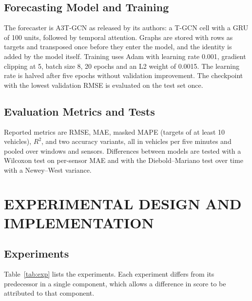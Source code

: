 \documentclass[MTech]{ugthesis}
\begin{document}
\section{Forecasting Model and Training}
The forecaster is A3T-GCN as released by its authors: a T-GCN cell with a GRU of 100 units, followed by temporal attention. Graphs are stored with rows as targets and transposed once before they enter the model, and the identity is added by the model itself. Training uses Adam with learning rate 0.001, gradient clipping at 5, batch size 8, 20 epochs and an L2 weight of 0.0015. The learning rate is halved after five epochs without validation improvement. The checkpoint with the lowest validation RMSE is evaluated on the test set once.

\section{Evaluation Metrics and Tests}
Reported metrics are RMSE, MAE, masked MAPE (targets of at least 10 vehicles), $R^2$, and two accuracy variants, all in vehicles per five minutes and pooled over windows and sensors. Differences between models are tested with a Wilcoxon test on per-sensor MAE and with the Diebold--Mariano test \citep{diebold1995} over time with a Newey--West variance.

\chapter{EXPERIMENTAL DESIGN AND IMPLEMENTATION}

\section{Experiments}
Table~\ref{tab:exp} lists the experiments. Each experiment differs from its predecessor in a single component, which allows a difference in score to be attributed to that component.
\end{document}
